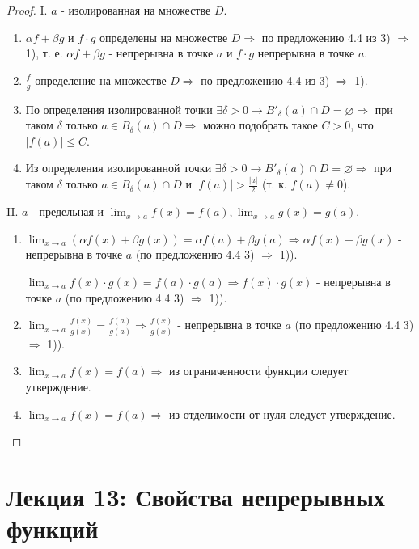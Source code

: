 	\begin{proof}
		I. $a$ - изолированная на множестве $D$.
		\begin{enumerate}
			\item $\alpha f + \beta g$ и $f \cdot g$ определены на множестве $D \Rightarrow$ по предложению 4.4 из 3) $\Rightarrow$ 1), т. е. $\alpha f + \beta g$ - непрерывна в точке $a$ и $f \cdot g$ непрерывна в точке $a$.
			\item $\frac{f}{g}$ определение на множестве $D \Rightarrow$ по предложению 4.4 из 3) $\Rightarrow$ 1).
			\item По определения изолированной точки $\exists \delta > 0 \rightarrow B'_{\delta}(a) \cap D = \varnothing \Rightarrow$ при таком $\delta$ только $a \in B_{\delta}(a) \cap D \Rightarrow$ можно подобрать такое $C > 0$, что $|f(a)| \leqslant C.$
			\item Из определения изолированной точки $\exists \delta > 0 \rightarrow B'_{\delta}(a) \cap D = \varnothing \Rightarrow$ при таком $\delta$ только $a \in B_{\delta}(a) \cap D$ и $|f(a)| > \frac{|a|}{2}$ (т. к. $f(a) \neq 0$).
		\end{enumerate}
		II. $a$ - предельная и $\lim_{x \to a} f(x) = f(a), \lim_{x \to a} g(x) = g(a).$
		\begin{enumerate}
			\item $\lim_{x \to a} (\alpha f(x) + \beta g(x)) = \alpha f(a) + \beta g(a) \Rightarrow \alpha f(x) + \beta g(x)$ - непрерывна в точке $a$ (по предложению 4.4 3) $\Rightarrow$ 1)).
			
			$\lim_{x \to a} f(x) \cdot g(x) = f(a) \cdot g(a) \Rightarrow f(x) \cdot g(x)$ - непрерывна в точке $a$ (по предложению 4.4 3) $\Rightarrow$ 1)).
			\item $\lim_{x \to a} \frac{f(x)}{g(x)} = \frac{f(a)}{g(a)} \Rightarrow \frac{f(x)}{g(x)}$ - непрерывна в точке $a$ (по предложению 4.4 3) $\Rightarrow$ 1)).
			\item $\lim_{x \to a} f(x) = f(a) \Rightarrow$ из ограниченности функции следует утверждение.
			\item $\lim_{x \to a} f(x) = f(a) \Rightarrow$ из отделимости от нуля следует утверждение.
		\end{enumerate}
	\end{proof}
	
	\newpage
	
	\section*{Лекция 13: Свойства непрерывных функций}
	
